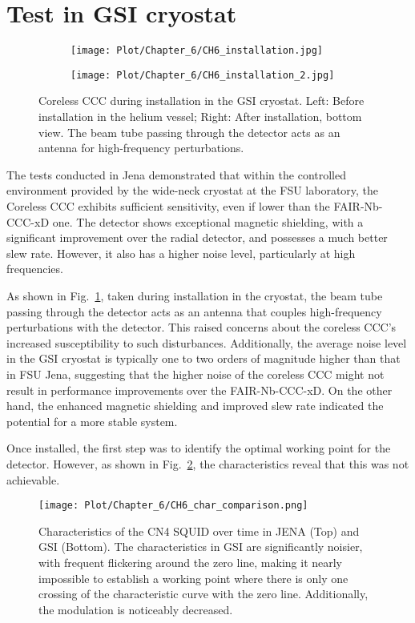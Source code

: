 \documentclass[12pt,a4paper]{report}
\begin{document}
\begin{itemize}
        \end{itemize}
    \section{Test in GSI cryostat}
	\begin{figure}[H]
		\begin{subfigure}[b]{0.42\textwidth}
			\centering
			\texttt{[image: Plot/Chapter\_6/CH6\_installation.jpg]}
		\end{subfigure}
		\hfill
		\begin{subfigure}[b]{0.58\textwidth}
			\centering
			\texttt{[image: Plot/Chapter\_6/CH6\_installation\_2.jpg]}
		\end{subfigure}
		\caption{\small{Coreless CCC during installation in the GSI cryostat. Left: Before installation in the helium vessel; Right: After installation, bottom view. The beam tube passing through the detector acts as an antenna for high-frequency perturbations.}}
		\label{CH6_coreless_installation}
	\end{figure}
	The tests conducted in Jena demonstrated that within the controlled environment provided by the wide-neck cryostat at the FSU laboratory, the Coreless CCC exhibits sufficient sensitivity, even if lower than the FAIR-Nb-CCC-xD one. The detector shows exceptional magnetic shielding, with a significant improvement over the radial detector, and possesses a much better slew rate. However, it also has a higher noise level, particularly at high frequencies.
	
	As shown in Fig.~\ref{CH6_coreless_installation}, taken during installation in the cryostat, the beam tube passing through the detector acts as an antenna that couples high-frequency perturbations with the detector. This raised concerns about the coreless CCC's increased susceptibility to such disturbances. Additionally, the average noise level in the GSI cryostat is typically one to two orders of magnitude higher than that in FSU Jena, suggesting that the higher noise of the coreless CCC might not result in performance improvements over the FAIR-Nb-CCC-xD. On the other hand, the enhanced magnetic shielding and improved slew rate indicated the potential for a more stable system.
	
	Once installed, the first step was to identify the optimal working point for the detector. However, as shown in Fig.~\ref{CH6_GSI_char}, the characteristics reveal that this was not achievable.
	
	\begin{figure}[H]
		\centering
		\texttt{[image: Plot/Chapter\_6/CH6\_char\_comparison.png]}
		\caption{\small{Characteristics of the CN4 SQUID over time in JENA (Top) and GSI (Bottom). The characteristics in GSI are significantly noisier, with frequent flickering around the zero line, making it nearly impossible to establish a working point where there is only one crossing of the characteristic curve with the zero line. Additionally, the modulation is noticeably decreased.}}
		\label{CH6_GSI_char} 
	\end{figure}
	
\end{document}
